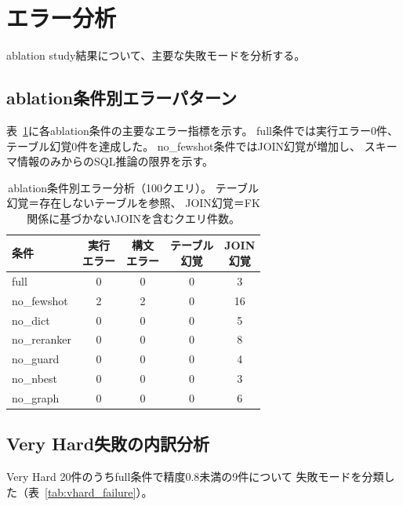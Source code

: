 \documentclass[5p,twocolumn]{elsarticle}
\begin{document}
\section{エラー分析}
\label{sec:error_analysis}

ablation study結果について、主要な失敗モードを分析する。

\subsection{ablation条件別エラーパターン}

表~\ref{tab:error_analysis}に各ablation条件の主要なエラー指標を示す。
full条件では実行エラー0件、テーブル幻覚0件を達成した。
no\_fewshot条件ではJOIN幻覚が増加し、
スキーマ情報のみからのSQL推論の限界を示す。

\begin{table}[t]
  \centering
  \caption{ablation条件別エラー分析（100クエリ）。
  テーブル幻覚＝存在しないテーブルを参照、
  JOIN幻覚＝FK関係に基づかないJOINを含むクエリ件数。}
  \label{tab:error_analysis}
  \small
  \begin{tabular}{lcccc}
    \toprule
    条件 & \shortstack{実行\\エラー} & \shortstack{構文\\エラー} & \shortstack{テーブル\\幻覚} & \shortstack{JOIN\\幻覚} \\
    \midrule
    full          & 0 & 0 & 0 & 3 \\
    no\_fewshot   & 2 & 2 & 0 & 16 \\
    no\_dict      & 0 & 0 & 0 & 5 \\
    no\_reranker  & 0 & 0 & 0 & 8 \\
    no\_guard     & 0 & 0 & 0 & 4 \\
    no\_nbest     & 0 & 0 & 0 & 3 \\
    no\_graph     & 0 & 0 & 0 & 6 \\
    \bottomrule
  \end{tabular}
\end{table}

\subsection{Very Hard失敗の内訳分析}

Very Hard 20件のうちfull条件で精度0.8未満の9件について
失敗モードを分類した（表~\ref{tab:vhard_failure}）。
\end{document}
